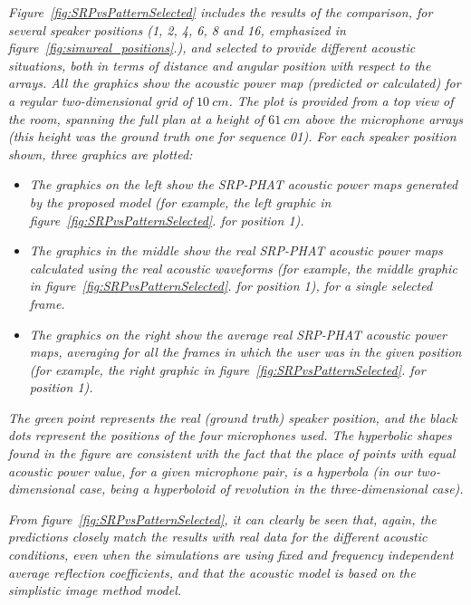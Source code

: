 \emph{Figure~\ref{fig:SRPvsPatternSelected} includes the results of the comparison, for several speaker positions (1, 2, 4, 6, 8 and 16, emphasized in figure~\ref{fig:simureal_positions}.), and selected to provide different acoustic situations, both in terms of distance and angular position with respect to the arrays. All the graphics show the acoustic power map (predicted or calculated) for a regular two-dimensional grid of $10~cm$. The plot is provided from a top view of the room, spanning the full plan at a height of $61~cm$ above the microphone arrays (this height was the ground truth one for sequence 01). For each speaker position shown, three graphics are plotted:}

\begin{itemize}
  \item \emph{The graphics on the left show the SRP-PHAT acoustic power maps generated by the proposed model (for example, the left graphic in figure~\ref{fig:SRPvsPatternSelected}. for position 1).}
  \item \emph{The graphics in the middle show the real SRP-PHAT acoustic power maps calculated using the real acoustic waveforms (for example, the middle graphic in figure~\ref{fig:SRPvsPatternSelected}. for position 1), for a single selected frame.}
  \item \emph{The graphics on the right show the average real SRP-PHAT acoustic power maps, averaging for all the frames in which the user was in the given position (for example, the right graphic in figure~\ref{fig:SRPvsPatternSelected}. for position 1).}
\end{itemize}

\emph{The green point represents the real (ground truth) speaker position, and the black dots represent the positions of the four microphones used. The hyperbolic shapes found in the figure are consistent with the fact that the place of points with equal acoustic power value, for a given microphone pair, is a hyperbola (in our two-dimensional case, being a hyperboloid of revolution in the three-dimensional case).}

\emph{From figure~\ref{fig:SRPvsPatternSelected}, it can clearly be seen that, again, the predictions closely match the results with real data for the different acoustic conditions, even when the simulations are using fixed and frequency independent average reflection coefficients, and that the acoustic model is based on the simplistic image method model.}

